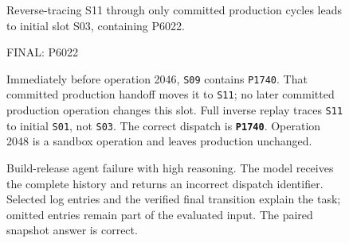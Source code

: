 \begin{figure}[htbp]
\begin{tcolorbox}[enhanced,breakable=false,colback=stalefill,colframe=staleink,boxrule=0.8pt,arc=1mm,fonttitle=\bfseries\small,title={Sol answer to the complete history (verbatim)}]
\small
Reverse-tracing S11 through only committed production cycles leads to initial slot S03, containing P6022.\par
FINAL: P6022
\end{tcolorbox}
\begin{tcolorbox}[enhanced,breakable=false,colback=currentfill,colframe=currentink,boxrule=0.8pt,arc=1mm,fonttitle=\bfseries\small,title={Verified current state (post-hoc annotation)}]
\small
Immediately before operation 2046, \texttt{S09} contains \texttt{P1740}. That committed production handoff moves it to \texttt{S11}; no later committed production operation changes this slot. Full inverse replay traces \texttt{S11} to initial \texttt{S01}, not \texttt{S03}. The correct dispatch is \textbf{\texttt{P1740}}. Operation 2048 is a sandbox operation and leaves production unchanged.
\end{tcolorbox}
\caption{Build-release agent failure with high reasoning. The model receives the
complete history and returns an incorrect dispatch identifier. Selected log
entries and the verified final transition explain the task; omitted entries
remain part of the evaluated input. The paired snapshot answer is correct.}
\label{fig:frontier-log-build}
\end{figure}
